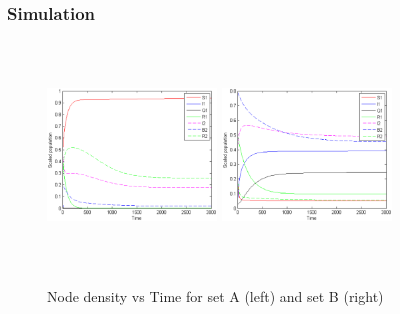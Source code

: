 \documentclass{beamer}
\begin{document}
\begin{frame}\frametitle{Simulation}

\begin{figure}
  \centering
  \subfloat \label{fig:a}{\includegraphics[height=6cm,width=4.5cm]{13-DR3}}\qquad
  \subfloat \label{fig:b}{\includegraphics[height=6cm,width=4.5cm]{13-DR8}}
\caption{Node density vs Time for set A (left) and set B (right)}
\label{fig:1}
\end{figure}
\end{frame}
\end{document}
